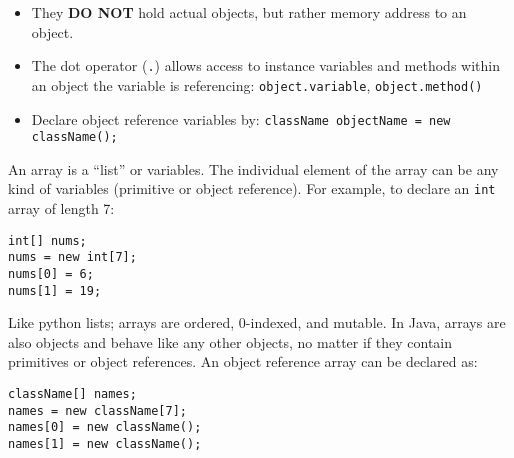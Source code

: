 \documentclass{tufte-handout}
\begin{document}
\begin{itemize}
        \begin{itemize}
             \item They \textbf{DO NOT} hold actual objects, but rather memory address to an object.
             \item The dot operator (\texttt{.}) allows access to instance variables and methods within an object the variable is referencing: \texttt{object.variable}, \texttt{object.method()}
             \item Declare object reference variables by: \texttt{className objectName = new className();}
         \end{itemize} 
    \end{itemize}

    An array is a ``list'' or variables. The individual element of the array can be any kind of variables (primitive or object reference). For example, to declare an \texttt{int} array of length 7:

    \begin{lstlisting}
int[] nums;
nums = new int[7];
nums[0] = 6;
nums[1] = 19;
    \end{lstlisting}

    Like python lists; arrays are ordered, 0-indexed, and mutable. In Java, arrays are also objects and behave like any other objects, no matter if they contain primitives or object references. An object reference array can be declared as:
    
    \begin{lstlisting}
className[] names;
names = new className[7];
names[0] = new className();
names[1] = new className();
    \end{lstlisting}
\end{document}
